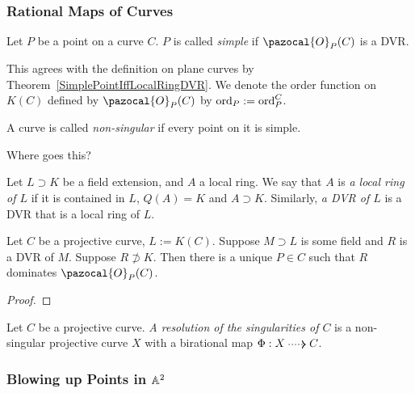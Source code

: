         \subsubsection{Rational Maps of Curves}
        \begin{definition}
            Let $P$ be a point on a curve $C$. $P$ is called \textit{simple} if $\pazocal{O}_P(C)$ is a DVR. 
        \end{definition}
        \begin{remark}
            This agrees with the definition on plane curves by Theorem~\ref{SimplePointIffLocalRingDVR}. We denote the order function on $K(C)$ defined by $\pazocal{O}_P(C)$ by $\mathrm{ord}_P:=\mathrm{ord}_P^C$. 
        \end{remark}
        \begin{definition}
            A curve is called \textit{non-singular} if every point on it is simple.
        \end{definition}
        {\Large Where goes this?}
        \begin{definition}
            Let $L\supset K$ be a field extension, and $A$ a local ring. We say that $A$ is \textit{a local ring of $L$} if it is contained in $L$, $Q(A)=K$ and $A\supset K$. Similarly, \textit{a DVR of $L$} is a DVR that is a local ring of $L$.  
        \end{definition}
        \begin{theorem}
            Let $C$ be a projective curve, $L:=K(C)$. Suppose $M\supset L$ is some field and $R$ is a DVR of $M$. Suppose $R\not\supset K$. Then there is a unique $P\in C$ such that $R$ dominates $\pazocal{O}_P(C)$. 
        \end{theorem}
        \begin{proof}
            
        \end{proof}
        \begin{corollary}
            
        \end{corollary}
        \begin{definition}
            Let $C$ be a projective curve. \textit{A resolution of the singularities of $C$} is a non-singular projective curve $X$ with a birational map $\Phi : X\dottedarrow C$. 
        \end{definition}
    \subsubsection{Blowing up Points in $\mathbb{A}^2$}
        
